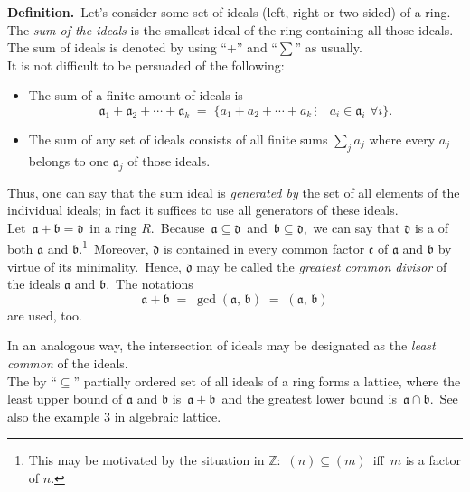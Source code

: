 \documentclass[12pt]{article}
\begin{document}
\textbf{Definition.}\, Let's consider some set of ideals (left, right or two-sided) of a ring.\, The {\em sum of the ideals} is the smallest ideal of the ring containing all those ideals.\, The sum of ideals is denoted by using ``+'' and ``$\sum$'' as usually.\\


It is not difficult to be persuaded of the following:
\begin{itemize}
 \item The sum of a finite amount of ideals is
   $$\mathfrak{a}_1+\mathfrak{a}_2+\cdots+\mathfrak{a}_k \;=\; 
   \{a_1\!+\!a_2\!+\!\cdots\!+\!a_k\,\vdots \quad a_i \in \mathfrak{a}_i 
    \,\,\forall i\}.$$
 \item The sum of any set of ideals consists of all finite sums 
$\displaystyle\sum_j a_j$ where every $a_j$ belongs to one $\mathfrak{a}_j$ of those ideals.
\end{itemize}
Thus, one can say that the sum ideal is {\em generated by} the set of all elements of the individual ideals; in fact it suffices to use all generators of these ideals.\\

Let\, $\mathfrak{a}+\mathfrak{b} = \mathfrak{d}$\, in a ring $R$.\, Because\, $\mathfrak{a} \subseteq \mathfrak{d}$\, and\, $\mathfrak{b} \subseteq \mathfrak{d}$,\, we can say that $\mathfrak{d}$ is a  of both $\mathfrak{a}$ and $\mathfrak{b}$.\footnote{This may be motivated by the situation in $\mathbb{Z}$:\, $(n) \subseteq (m)$\, iff\, $m$ is a factor of $n$.}\, Moreover, $\mathfrak{d}$ is contained in every common factor $\mathfrak{c}$ of $\mathfrak{a}$ and $\mathfrak{b}$ by virtue of its minimality.\, Hence, $\mathfrak{d}$ may be called the {\em greatest common divisor} of the ideals $\mathfrak{a}$ and $\mathfrak{b}$.\, The notations
$$\mathfrak{a}+\mathfrak{b} \;=\; \gcd(\mathfrak{a},\,\mathfrak{b}) \;=\; (\mathfrak{a}, \,\mathfrak{b})$$
are used, too.

In an analogous way, the intersection of ideals may be designated as the {\em least common } of the ideals.\\

The by ``$\subseteq$'' partially ordered set of all ideals of a ring forms a lattice, where the least upper bound of $\mathfrak{a}$ and $\mathfrak{b}$ is\, $\mathfrak{a+b}$\, and the greatest lower bound is\, $\mathfrak{a\cap b}$.\, See also the example 3 in algebraic lattice.

\end{document}
